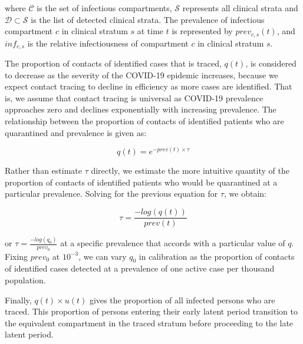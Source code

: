 where $\mathcal{C}$ is the set of infectious compartments, $\mathcal{S}$ represents all clinical strata and $\mathcal{D} \subset \mathcal{S}$ is the list of detected clinical strata.
The prevalence of infectious compartment $c$ in clinical stratum $s$ at time $t$ is represented by $prev_{c, s}(t)$, and $inf_{c, s}$ is the relative infectiousness of compartment $c$ in clinical stratum $s$.

The proportion of contacts of identified cases that is traced, \(q(t)\), is considered to decrease as the severity of the COVID-19 epidemic increases, because we expect contact tracing to decline in efficiency as more cases are identified.
That is, we assume that contact tracing is universal as COVID-19 prevalence approaches zero and declines exponentially with increasing prevalence.
The relationship between the proportion of contacts of identified patients who are quarantined and prevalence is given as:

\[q(t) = e^{-prev(t) \times \tau }\]

Rather than estimate \(\tau\) directly, we estimate the more intuitive quantity of the proportion of contacts of identified patients who would be quarantined at a particular prevalence.
Solving for the previous equation for \(\tau\), we obtain:

\[\tau = \frac{-log(q(t))}{prev(t)} \]

or \(\tau = \frac{-log(q_{0})}{prev_{0}} \) at a specific prevalence that accords with a particular value of \(q\). Fixing \(prev_{0}\) at \(10^{-3}\), we can vary \(q_{0}\) in calibration as the proportion of contacts of identified cases detected at a prevalence of one active case per thousand population.

Finally, \(q(t) \times u(t) \) gives the proportion of all infected persons who are traced. This proportion of persons entering their early latent period transition to the equivalent compartment in the traced stratum before proceeding to the late latent period.
